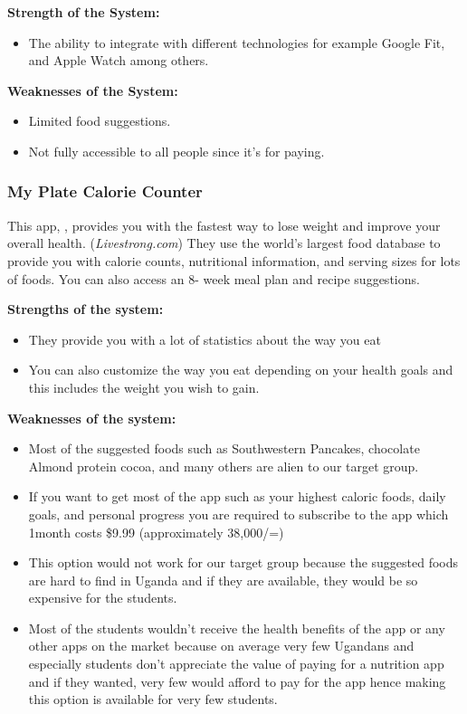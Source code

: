 \documentclass{article}
\begin{document}
\textbf{Strength of the System:}
\begin{itemize}
\item The ability to integrate with different technologies for example Google Fit, and Apple Watch among others.
\end{itemize}

\textbf{Weaknesses of the System:}
\begin{itemize}
\item Limited food suggestions.
\item Not fully accessible to all people since it's for paying.
\end{itemize}

\subsubsection{My Plate Calorie Counter}
This app, \cite{myplate}, provides you with the fastest way to lose weight and improve your overall health.
(\textit{Livestrong.com}) They use the world’s largest food database to provide you with calorie
counts, nutritional information, and serving sizes for lots of foods. You can also access an 8-
week meal plan and recipe suggestions.

\textbf{Strengths of the system:}
\begin{itemize}
\item They provide you with a lot of statistics about the way you eat
\item You can also customize the way you eat depending on your health goals and this includes the weight you wish to gain.
\end{itemize}

\textbf{Weaknesses of the system:}
\begin{itemize}
\item Most of the suggested foods such as Southwestern Pancakes, chocolate Almond protein cocoa, and many others are alien to our target group.
\item If you want to get most of the app such as your highest caloric foods, daily goals, and personal progress you are required to subscribe to the app which 1month costs \$9.99 (approximately 38,000/=)
\item This option would not work for our target group because the suggested foods are hard to find in Uganda and if they are available, they would be so expensive for the students.
\item Most of the students wouldn’t receive the health benefits of the app or any other apps on the market because on average very few Ugandans and especially students don’t appreciate the value of paying for a nutrition app and if they wanted, very few would afford to pay for the app hence making this option is available for very few students.
\end{itemize}
\end{document}
